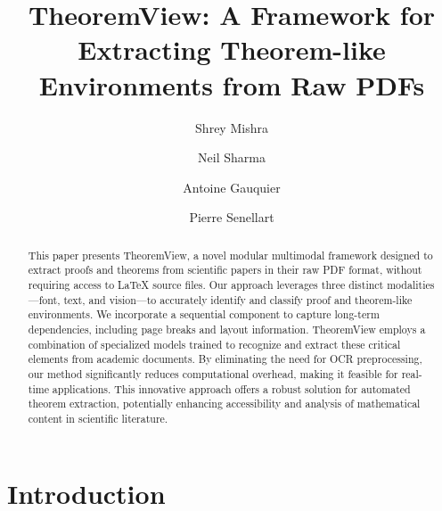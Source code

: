 \documentclass[runningheads]{llncs}
\begin{document}
%
\title{TheoremView: A Framework for Extracting Theorem-like Environments from Raw PDFs}
%
%
\author{Shrey Mishra \and
Neil Sharma \and
Antoine Gauquier \and
Pierre Senellart}



\maketitle              %
%
\begin{abstract}
This paper presents TheoremView, a novel modular multimodal framework designed 
to extract proofs and theorems from scientific papers in their raw PDF format, 
without requiring access to LaTeX source files. Our approach leverages three 
distinct modalities—font, text, and vision—to accurately identify and classify 
proof and theorem-like environments. We incorporate a sequential component to capture 
long-term dependencies, including page breaks and layout information. 
TheoremView employs a combination of specialized models trained to recognize 
and extract these critical elements from academic documents. By eliminating 
the need for OCR preprocessing, our method significantly reduces computational 
overhead, making it feasible for real-time applications. This innovative 
approach offers a robust solution for automated theorem extraction, potentially 
enhancing accessibility and analysis of mathematical content in scientific 
literature.

\end{abstract}
%
%
%
\section{Introduction}
\end{document}
